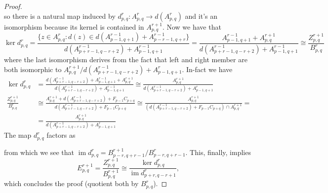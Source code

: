 \documentclass[a4paper]{article}
\DeclareMathOperator{\Ima}{im}			%
\theoremstyle{plain}
\theoremstyle{definition}
\newtheorem{remark}{Remark}[thm]
\begin{document}
\begin{proof}
\[			\]
			so there is a natural map induced by $d^r_{p,q}\colon A^r_{p,q} \to d(A^r_{p,q})$ and it's an isomorphism because its kernel is contained in $A^{r+1}_{p,q}$.
			Now we have that
			\[
				\ker d^r_{p,q} = \frac{\{z \in A^r_{p,q} : d(z) \in d(A^{r-1}_{p-1, q+1}) + A^{r-1}_{p-r-1, q+r}\}}{d(A^{r-1}_{p+r-1, q-r+2}) + A^{r-1}_{p-1,q+1}} = \frac{A^{r-1}_{p-1, q+1} + A^{r+1}_{p,q}}{d(A^{r-1}_{p+r-1, q-r+2}) + A^{r-1}_{p-1,q+1}} \cong \frac{Z^{r+1}_{p,q}}{B^r_{p,q}}
			\]
			where the last isomorphism derives from the fact that left and right member are both isomorphic to $A^{r+1}_{p,q}/d(A^{r-1}_{p+r-1, q-r+2}) + A^{r}_{p-1,q+1}$. In-fact we have
			\begin{align*}
				\ker d^r_{p,q} &= \frac{d(A^{r-1}_{p+r-1, q-r+2}) + A^{r-1}_{p-1, q+1} + A^{r+1}_{p,q}}{d(A^{r-1}_{p+r-1, q-r+2}) + A^{r-1}_{p-1,q+1}} \cong \frac{A^{r+1}_{p,q}}{d(A^{r-1}_{p+r-1, q-r+2}) + A^{r}_{p-1,q+1}} \\
				\frac{Z^{r+1}_{p,q}}{B^r_{p,q}} &\cong \frac{A^{r+1}_{p,q} + d(A^{r-1}_{p+r-1,q-r+2}) + F_{p-1}C_{p+q}}{d(A^{r-1}_{p+r-1,q-r+2}) + F_{p-1}C_{p+q}} \cong \frac{A^{r+1}_{p,q}}{(d(A^{r-1}_{p+r-1,q-r+2}) + F_{p-1}C_{p+q}) \cap A^{r+1}_{p,q}} =\\
				&=  \frac{A^{r+1}_{p,q}}{d(A^{r-1}_{p+r-1,q-r+2}) + A^r_{p-1,q+1}}
			\end{align*}
			The map $d^r_{p,q}$ factors as
			\begin{center}
			\end{center}
			from which we see that $\Ima d^r_{p,q} = B^{r+1}_{p-r, q+r-1}/B^r_{p-r, q+r-1}$. This, finally, implies
			\[
				E^{r+1}_{p,q} = \frac{Z^{r+1}_{p,q}}{B^{r+1}_{p,q}} \cong \frac{\ker d^r_{p,q}}{\Ima d^r_{p+r, q-r+1}},
			\]
			which concludes the proof (quotient both by $B^r_{p,q}$).
		\end{proof}
		\begin{comment}
			\begin{remark}
			The spectral sequence constructed from $\cup F_pC$ is isomorphic to the one corresponding to $C$ so, from now on, we'll always assume filtrations on $C$ to be exhaustive.
			\end{remark}
		\end{comment}
\end{document}
